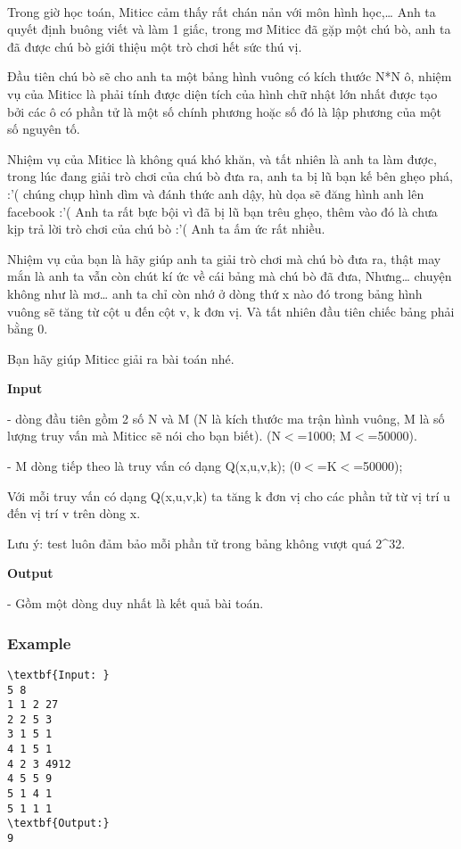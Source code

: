 

 

Trong giờ học toán, Miticc cảm thấy rất chán nản với môn hình học,… Anh ta quyết định buông viết và làm 1 giấc, trong mơ Miticc đã gặp một chú bò, anh ta đã được chú bò giới thiệu một trò chơi hết sức thú vị.

Đầu tiên chú bò sẽ cho anh ta một bảng hình vuông có kích thước N*N ô, nhiệm vụ của Miticc là phải tính được diện tích của hình chữ nhật lớn nhất được tạo bởi các ô có phần tử là một số chính phương hoặc số đó là lập phương của một số nguyên tố.

Nhiệm vụ của Miticc là không quá khó khăn, và tất nhiên là anh ta làm được, trong lúc đang giải trò chơi của chú bò đưa ra, anh ta bị lũ bạn kế bên ghẹo phá, :’( chúng chụp hình dìm và đánh thức anh dậy, hù dọa sẽ đăng hình anh lên facebook :’( Anh ta rất bực bội vì đã bị lũ bạn trêu ghẹo, thêm vào đó là chưa kịp trả lời trò chơi của chú bò :’( Anh ta ấm ức rất nhiều.

Nhiệm vụ của bạn là hãy giúp anh ta giải trò chơi mà chú bò đưa ra, thật may mắn là anh ta vẫn còn chút kí ức về cái bảng mà chú bò đã đưa, Nhưng… chuyện không như là mơ… anh ta chỉ còn nhớ ở dòng thứ x nào đó trong bảng hình vuông sẽ tăng từ cột u đến cột v, k đơn vị. Và tất nhiên đầu tiên chiếc bảng phải bằng 0.

Bạn hãy giúp Miticc giải ra bài toán nhé.

\textbf{Input }

- dòng đầu tiên gồm 2 số N và M (N là kích thước ma trận hình vuông, M là số lượng truy vấn mà Miticc sẽ nói cho bạn biết). (N$<$=1000; M$<$=50000).

- M dòng tiếp theo là truy vấn có dạng Q(x,u,v,k); (0$<$=K$<$=50000);

Với mỗi truy vấn có dạng Q(x,u,v,k) ta tăng k đơn vị cho các phần tử từ vị trí u đến vị trí v trên dòng x.

Lưu ý: test luôn đảm bảo mỗi phần tử trong bảng không vượt quá 2\textasciicircum32.

\textbf{Output }

- Gồm một dòng duy nhất là kết quả bài toán.

\subsubsection{Example}
\begin{verbatim}
\textbf{Input: }
5 8
1 1 2 27
2 2 5 3
3 1 5 1
4 1 5 1
4 2 3 4912
4 5 5 9
5 1 4 1
5 1 1 1
\textbf{Output:}
9\end{verbatim}